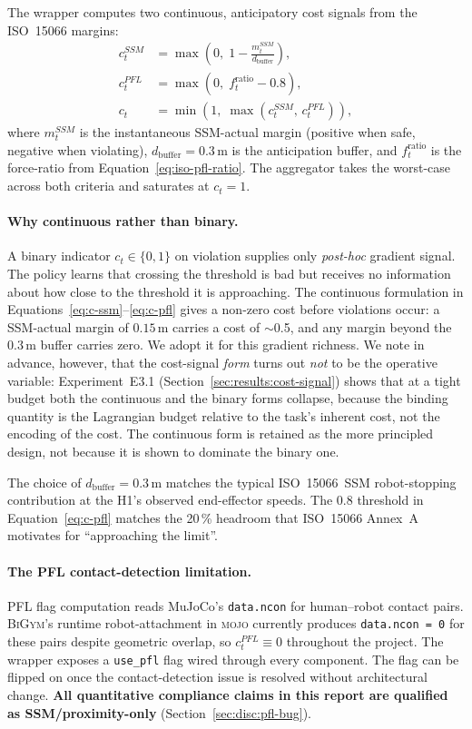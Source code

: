 \documentclass[11pt,a4paper]{report}
\newcommand{\ssm}{SSM}
\newcommand{\pfl}{PFL}
\newcommand{\iso}{ISO~15066}
\newcommand{\bigym}{\textsc{BiGym}}
\begin{document}
The wrapper computes two continuous, anticipatory cost signals from
the \iso{} margins:
\begin{align}
  c^{\ssm}_t  &= \max\!\left(0,\; 1 - \frac{m^{\ssm}_t}{d_{\mathrm{buffer}}}\right),
    \label{eq:c-ssm} \\
  c^{\pfl}_t  &= \max\!\left(0,\; f^{\mathrm{ratio}}_t - 0.8\right),
    \label{eq:c-pfl} \\
  c_t         &= \min\!\left(1,\; \max(c^{\ssm}_t,\, c^{\pfl}_t)\right),
    \label{eq:c-total}
\end{align}
where $m^{\ssm}_t$ is the instantaneous \ssm{}-actual margin
(positive when safe, negative when violating), $d_{\mathrm{buffer}}
= 0.3$\,m is the anticipation buffer, and $f^{\mathrm{ratio}}_t$ is
the force-ratio from Equation~\ref{eq:iso-pfl-ratio}. The
aggregator takes the worst-case across both criteria and saturates
at $c_t = 1$.

\paragraph{Why continuous rather than binary.}
A binary indicator $c_t \in \{0,1\}$ on violation supplies only
\emph{post-hoc} gradient signal. The policy learns that crossing
the threshold is bad but receives no information about how close to
the threshold it is approaching. The continuous formulation in
Equations~\ref{eq:c-ssm}--\ref{eq:c-pfl} gives a non-zero cost
before violations occur: a \ssm{}-actual margin of $0.15$\,m carries
a cost of $\sim$0.5, and any margin beyond the $0.3$\,m buffer
carries zero. We adopt it for this gradient richness. We note in
advance, however, that the cost-signal \emph{form} turns out
\emph{not} to be the operative variable: Experiment~E3.1
(Section~\ref{sec:results:cost-signal}) shows that at a tight budget
both the continuous and the binary forms collapse, because the
binding quantity is the Lagrangian budget relative to the task's
inherent cost, not the encoding of the cost. The continuous form is
retained as the more principled design, not because it is shown to
dominate the binary one.

The choice of $d_{\mathrm{buffer}} = 0.3$\,m matches the typical
\iso{}~\ssm{} robot-stopping contribution at the H1's observed
end-effector speeds. The 0.8 threshold in Equation~\ref{eq:c-pfl}
matches the 20\,\% headroom that \iso{} Annex~A motivates for
``approaching the limit''.

\paragraph{The \pfl{} contact-detection limitation.}
\pfl{} flag computation reads MuJoCo's \texttt{data.ncon} for
human--robot contact pairs. \bigym{}'s runtime robot-attachment in
\textsc{mojo} currently produces \texttt{data.ncon = 0} for these
pairs despite geometric overlap, so $c^{\pfl}_t \equiv 0$ throughout
the project. The wrapper exposes a \texttt{use\_pfl} flag wired
through every component. The flag can be flipped on once the
contact-detection issue is resolved without architectural change.
\textbf{All quantitative compliance claims in this report are
qualified as \ssm{}/proximity-only}
(Section~\ref{sec:disc:pfl-bug}).
\end{document}

